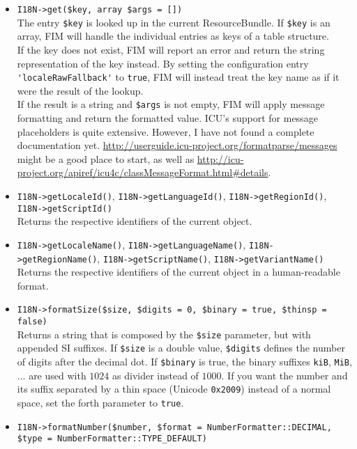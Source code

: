 \documentclass{scrartcl}
\begin{document}
      \begin{itemize}
         \item \lstinline!I18N->get($key, array $args = [])! \\
            The entry \lstinline!$key! is looked up in the current ResourceBundle. If \lstinline!$key! is an array, FIM will handle the individual entries as keys of a table structure. \\
            If the key does not exist, FIM will report an error and return the string representation of the key instead. By setting the configuration entry \lstinline!'localeRawFallback'! to \lstinline!true!, FIM will instead treat the key name as if it were the result of the lookup. \\
            If the result is a string and \lstinline!$args! is not empty, FIM will apply message formatting and return the formatted value. ICU's support for message placeholders is quite extensive. However, I have not found a complete documentation yet. \url{http://userguide.icu-project.org/formatparse/messages} might be a good place to start, as well as \url{http://icu-project.org/apiref/icu4c/classMessageFormat.html#details}.
         \item \lstinline!I18N->getLocaleId()!, \lstinline!I18N->getLanguageId()!, \lstinline!I18N->getRegionId()!, \lstinline!I18N->getScriptId()! \\
            Returns the respective identifiers of the current object.
         \item \lstinline!I18N->getLocaleName()!, \lstinline!I18N->getLanguageName()!, \lstinline!I18N->getRegionName()!, \lstinline!I18N->getScriptName()!, \lstinline!I18N->getVariantName()! \\
            Returns the respective identifiers of the current object in a human-readable format.
         \item \lstinline!I18N->formatSize($size, $digits = 0, $binary = true, $thinsp = false)! \\
            Returns a string that is composed by the \lstinline!$size! parameter, but with appended SI suffixes. If \lstinline!$size! is a double value, \lstinline!$digits! defines the number of digits after the decimal dot. If \lstinline!$binary! is true, the binary suffixes \texttt{kiB}, \texttt{MiB}, ... are used with $1024$ as divider instead of $1000$. If you want the number and its suffix separated by a thin space (Unicode \lstinline!0x2009!) instead of a normal space, set the forth parameter to \lstinline!true!.
         \item \lstinline!I18N->formatNumber($number, $format = NumberFormatter::DECIMAL, $type = NumberFormatter::TYPE_DEFAULT)! \\

\end{itemize}
\end{document}
